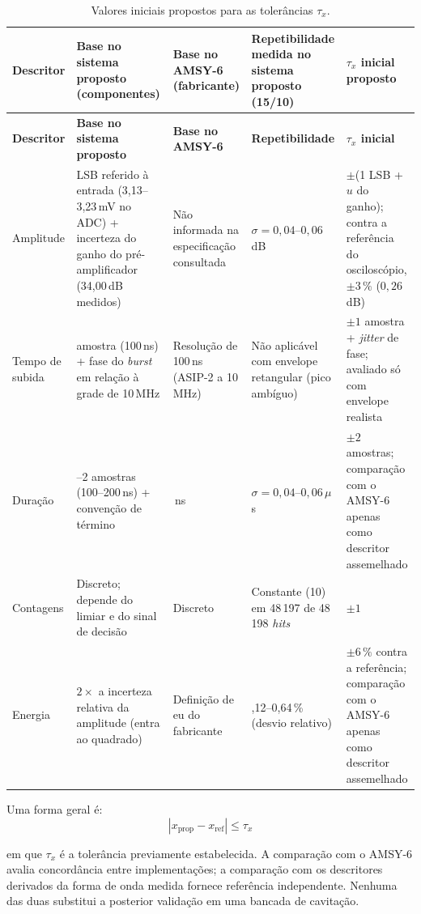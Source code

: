 \begingroup
\footnotesize
\renewcommand{\arraystretch}{1.25}
\begin{longtable}{
		|>{\raggedright\arraybackslash}p{}
		|>{\raggedright\arraybackslash}p{}
		|>{\raggedright\arraybackslash}p{}
		|>{\raggedright\arraybackslash}p{}
		|>{\raggedright\arraybackslash}p{}|}
	\caption{Valores iniciais propostos para as tolerâncias \(\tau_x\).}
	\label{v2:tab:tau_x_iniciais}\\
	\hline
	\textbf{Descritor} & \textbf{Base no sistema proposto (componentes)} & \textbf{Base no AMSY-6 (fabricante)} & \textbf{Repetibilidade medida no sistema proposto (15/10)} & \textbf{\(\tau_x\) inicial proposto} \\
	\hline
	\endfirsthead
	\hline
	\textbf{Descritor} & \textbf{Base no sistema proposto} & \textbf{Base no AMSY-6} & \textbf{Repetibilidade} & \textbf{\(\tau_x\) inicial} \\
	\hline
	\endhead
	\hline
	\endlastfoot
	Amplitude & 1 LSB referido à entrada (3,13--3,23\,mV no ADC) + incerteza do ganho do pré-amplificador (34,00\,dB medidos) & Não informada na especificação consultada & \(\sigma = 0{,}04\)--\(0{,}06\)\,dB & \(\pm\)(1 LSB + \(u\) do ganho); contra a referência do osciloscópio, \(\pm 3\,\%\) (\(0{,}26\)\,dB) \\
	\hline
	Tempo de subida & 1 amostra (100\,ns) + fase do \textit{burst} em relação à grade de 10\,MHz & Resolução de 100\,ns (ASIP-2 a 10\,MHz) & Não aplicável com envelope retangular (pico ambíguo) & \(\pm 1\) amostra + \textit{jitter} de fase; avaliado só com envelope realista \\
	\hline
	Duração & 1--2 amostras (100--200\,ns) + convenção de término & 100\,ns & \(\sigma = 0{,}04\)--\(0{,}06\,\mu\)s & \(\pm 2\) amostras; comparação com o AMSY-6 apenas como descritor assemelhado \\
	\hline
	Contagens & Discreto; depende do limiar e do sinal de decisão & Discreto & Constante (10) em 48\,197 de 48\,198 \textit{hits} & \(\pm 1\) \\
	\hline
	Energia & \(2\times\) a incerteza relativa da amplitude (entra ao quadrado) & Definição de eu do fabricante & 0,12--0,64\,\% (desvio relativo) & \(\pm 6\,\%\) contra a referência; comparação com o AMSY-6 apenas como descritor assemelhado \\
\end{longtable}
\endgroup

 Uma forma geral é:
\begin{equation}
	\left|x_{\mathrm{prop}} - x_{\mathrm{ref}} \right| \leq \tau_x
	\label{v2:eq:criterio_aceitacao_descritor}
\end{equation}

\noindent
em que \(\tau_x\) é a tolerância previamente estabelecida. A comparação com o AMSY-6 avalia concordância entre implementações; a comparação com os descritores derivados da forma de onda medida fornece referência independente. Nenhuma das duas substitui a posterior validação em uma bancada de cavitação.
